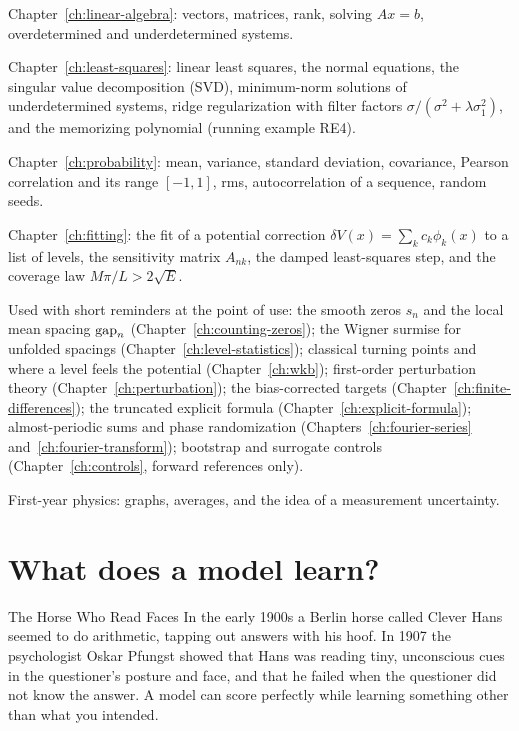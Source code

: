 \begin{prerequisites}
\item Chapter~\ref{ch:linear-algebra}: vectors, matrices, rank, solving $Ax=b$, overdetermined and underdetermined systems.
\item Chapter~\ref{ch:least-squares}: linear least squares, the normal equations, the singular value decomposition (SVD), minimum-norm solutions of underdetermined systems, ridge regularization with filter factors $\sigma/(\sigma^2+\lambda\sigma_1^2)$, and the memorizing polynomial (running example RE4).
\item Chapter~\ref{ch:probability}: mean, variance, standard deviation, covariance, Pearson correlation and its range $[-1,1]$, rms, autocorrelation of a sequence, random seeds.
\item Chapter~\ref{ch:fitting}: the fit of a potential correction $\delta V(x)=\sum_k c_k\phi_k(x)$ to a list of levels, the sensitivity matrix $A_{nk}$, the damped least-squares step, and the coverage law $M\pi/L>2\sqrt E$.
\item Used with short reminders at the point of use: the smooth zeros $s_n$ and the local mean spacing $\mathrm{gap}_n$ (Chapter~\ref{ch:counting-zeros}); the Wigner surmise for unfolded spacings (Chapter~\ref{ch:level-statistics}); classical turning points and where a level feels the potential (Chapter~\ref{ch:wkb}); first-order perturbation theory (Chapter~\ref{ch:perturbation}); the bias-corrected targets (Chapter~\ref{ch:finite-differences}); the truncated explicit formula (Chapter~\ref{ch:explicit-formula}); almost-periodic sums and phase randomization (Chapters~\ref{ch:fourier-series} and~\ref{ch:fourier-transform}); bootstrap and surrogate controls (Chapter~\ref{ch:controls}, forward references only).
\item First-year physics: graphs, averages, and the idea of a measurement uncertainty.
\end{prerequisites}

\section{What does a model learn?}\label{sec:generalization-learn}
\begin{didyouknow}{The Horse Who Read Faces}
In the early 1900s a Berlin horse called Clever Hans seemed to do arithmetic, tapping out answers with his hoof. In 1907 the psychologist Oskar Pfungst showed that Hans was reading tiny, unconscious cues in the questioner's posture and face, and that he failed when the questioner did not know the answer. A model can score perfectly while learning something other than what you intended.
\end{didyouknow}


